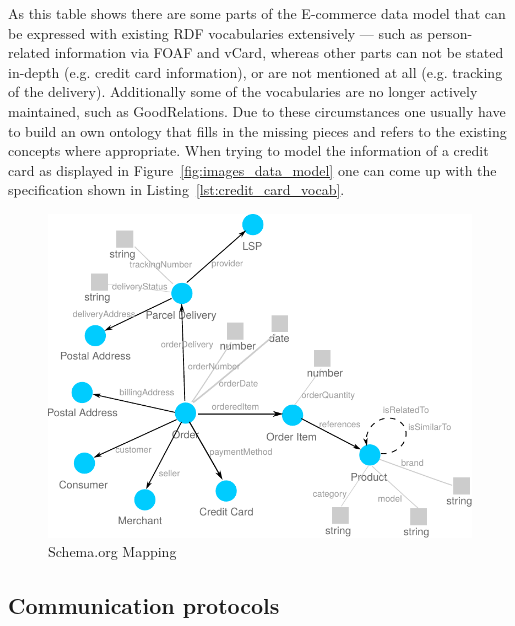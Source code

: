 As this table shows there are some parts of the \gls{E-commerce} data model that can be expressed with existing \gls{RDF} vocabularies extensively --- such as person-related information via \gls{FOAF} and \gls{vCard}, whereas other parts can not be stated in-depth (e.g. credit card information), or are not mentioned at all (e.g. tracking of the delivery). Additionally some of the vocabularies are no longer actively maintained, such as GoodRelations. Due to these circumstances one usually have to build an own ontology that fills in the missing pieces and refers to the existing concepts where appropriate. When trying to model the information of a credit card as displayed in Figure~\ref{fig:images_data_model} one can come up with the specification shown in Listing~\ref{lst:credit_card_vocab}. \@


\begin{figure}[H]
	\centering
		\includegraphics[width=0.8\columnwidth]{images/schema_org_mapping.pdf}
	\caption{Schema.org Mapping}
\label{fig:images_schema_org}
\end{figure}


\subsection{Communication protocols}
\label{subsec:comm_protocol}

